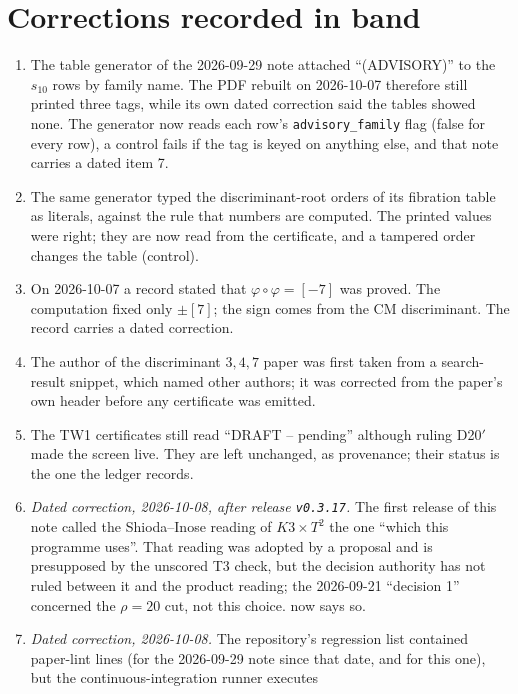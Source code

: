 \documentclass[11pt,a4paper]{article}
\theoremstyle{remark}
\begin{document}
\section{Corrections recorded in band}\label{sec:corrections}

\begin{correctionbox}
\begin{enumerate}
\item The table generator of the 2026-09-29 note attached ``(ADVISORY)'' to the $s_{10}$ rows by family
  name. The PDF rebuilt on 2026-10-07 therefore still printed three tags, while its own dated correction said
  the tables showed none. The generator now reads each row's \texttt{advisory\_family} flag (false for every
  row), a control fails if the tag is keyed on anything else, and that note carries a dated item 7.
\item The same generator typed the discriminant-root orders of its fibration table as literals, against the
  rule that numbers are computed. The printed values were right; they are now read from the certificate, and
  a tampered order changes the table (control).
\item On 2026-10-07 a record stated that $\varphi\circ\varphi=[-7]$ was proved. The computation fixed only
  $\pm[7]$; the sign comes from the CM discriminant. The record carries a dated correction.
\item The author of the discriminant $3,4,7$ paper was first taken from a search-result snippet, which
  named other authors; it was corrected from the paper's own header before any certificate was emitted.
\item The TW1 certificates still read ``DRAFT -- pending'' although ruling D20$'$ made the screen live. They
  are left unchanged, as provenance; their status is the one the ledger records.
\item \emph{Dated correction, 2026-10-08, after release \texttt{v0.3.17}.} The first release of this note
  called the Shioda--Inose reading of $K3\times T^2$ the one ``which this programme uses''. That reading was
  adopted by a proposal and is presupposed by the unscored T3 check, but the decision authority has not
  ruled between it and the product reading; the 2026-09-21 ``decision 1'' concerned the $\rho=20$ cut, not
  this choice.  now says so.
\item \emph{Dated correction, 2026-10-08.} The repository's regression list contained paper-lint lines
  (for the 2026-09-29 note since that date, and for this one), but the continuous-integration runner executes

\end{enumerate}
\end{correctionbox}
\end{document}
